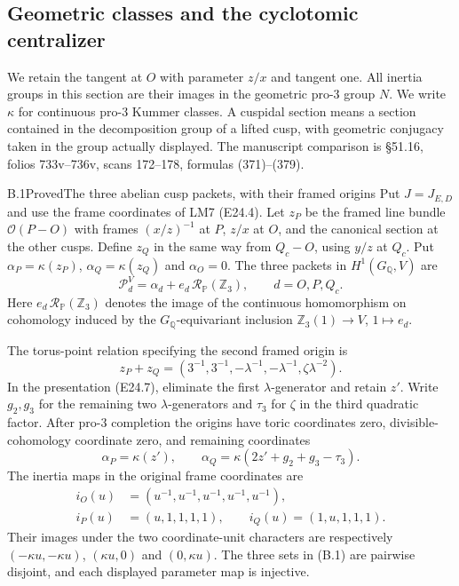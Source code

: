 \subsection{Geometric classes and the cyclotomic centralizer}

We retain the tangent at $O$ with parameter $z/x$ and tangent one.
All inertia groups in this section are their images in the geometric
pro-$3$ group $N$.  We write $\kappa$ for continuous pro-$3$ Kummer
classes.  A cuspidal section means a section contained in the
decomposition group of a lifted cusp, with geometric conjugacy taken
in the group actually displayed.  The manuscript comparison is
\S51.16, folios 733v--736v, scans 172--178, formulas (371)--(379).

\begin{statement}{B.1}{Proved}{The three abelian cusp packets, with their framed origins}
Put $J=J_{E,D}$ and use the frame coordinates of LM7 (E24.4).
Let $z_P$ be the framed line bundle $\mathcal O(P-O)$ with frames
$(x/z)^{-1}$ at $P$, $z/x$ at $O$, and the canonical section at the
other cusps.  Define $z_Q$ in the same way from $Q_c-O$, using $y/z$
at $Q_c$.  Put $\alpha_P=\kappa(z_P)$, $\alpha_Q=\kappa(z_Q)$ and
$\alpha_O=0$.  The three packets in $H^1(G_{\mathbb Q},V)$ are
\[
 \mathscr P_d^V=\alpha_d+e_d\,\mathcal R_{\mathbb P}(\mathbb Z_3),
 \qquad d=O,P,Q_c.                                      \tag{B.1}
\]
Here $e_d\,\mathcal R_{\mathbb P}(\mathbb Z_3)$ denotes the image of
the continuous homomorphism on cohomology induced by the
$G_{\mathbb Q}$-equivariant inclusion
$\mathbb Z_3(1)\to V$, $1\mapsto e_d$.

The torus-point relation specifying the second framed origin is
\[
 z_P+z_Q=
 (3^{-1},3^{-1},-\lambda^{-1},-\lambda^{-1},\zeta\lambda^{-2}).
                                                               \tag{B.2}
\]
In the presentation (E24.7), eliminate the first $\lambda$-generator
and retain $z'$.  Write $g_2,g_3$ for the remaining two
$\lambda$-generators and $\tau_3$ for $\zeta$ in the third quadratic
factor.  After pro-$3$ completion the origins have toric coordinates
zero, divisible-cohomology coordinate zero, and remaining coordinates
\[
 \alpha_P=\kappa(z'),\qquad
 \alpha_Q=\kappa(2z'+g_2+g_3-\tau_3).                   \tag{B.3}
\]
The inertia maps in the original frame coordinates are
\[
 \begin{split}
 i_O(u)&=(u^{-1},u^{-1},u^{-1},u^{-1},u^{-1}),\\
 i_P(u)&=(u,1,1,1,1),\qquad i_Q(u)=(1,u,1,1,1).
 \end{split}                                               \tag{B.4}
\]
Their images under the two coordinate-unit characters are respectively
$(-\kappa u,-\kappa u)$, $(\kappa u,0)$ and $(0,\kappa u)$.
The three sets in (B.1) are pairwise disjoint, and each displayed
parameter map is injective.
\end{statement}
